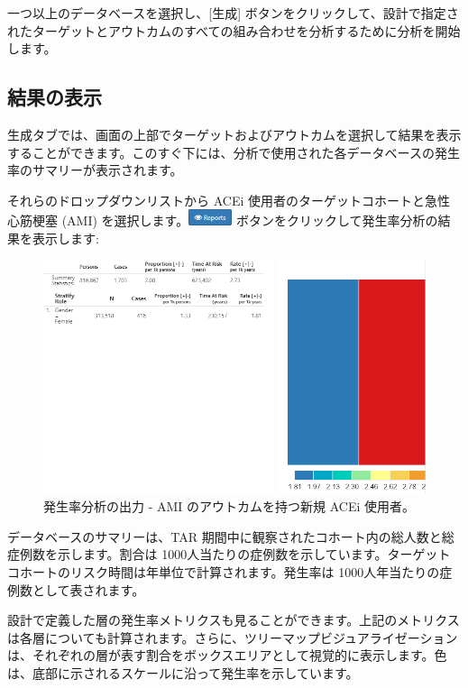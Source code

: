 \documentclass[
  11pt]{book}
\theoremstyle{definition}
\theoremstyle{definition}
\theoremstyle{definition}
\theoremstyle{definition}
\theoremstyle{remark}
\begin{document}
一つ以上のデータベースを選択し、{[}生成{]} ボタンをクリックして、設計で指定されたターゲットとアウトカムのすべての組み合わせを分析するために分析を開始します。

\subsection{結果の表示}\label{ux7d50ux679cux306eux8868ux793a-1}

生成タブでは、画面の上部でターゲットおよびアウトカムを選択して結果を表示することができます。このすぐ下には、分析で使用された各データベースの発生率のサマリーが表示されます。

それらのドロップダウンリストから ACEi 使用者のターゲットコホートと急性心筋梗塞 (AMI) を選択します。\includegraphics{images/Characterization/atlasIncidenceReportButton.png} ボタンをクリックして発生率分析の結果を表示します:

\begin{figure}

{\centering \includegraphics[width=1\linewidth]{images/Characterization/atlasIncidenceResults} 

}

\caption{発生率分析の出力 - AMI のアウトカムを持つ新規 ACEi 使用者。}\label{fig:atlasIncidenceResults}
\end{figure}

データベースのサマリーは、TAR 期間中に観察されたコホート内の総人数と総症例数を示します。割合は 1000人当たりの症例数を示しています。ターゲットコホートのリスク時間は年単位で計算されます。発生率は 1000人年当たりの症例数として表されます。

設計で定義した層の発生率メトリクスも見ることができます。上記のメトリクスは各層についても計算されます。さらに、ツリーマップビジュアライゼーションは、それぞれの層が表す割合をボックスエリアとして視覚的に表示します。色は、底部に示されるスケールに沿って発生率を示しています。
\end{document}
